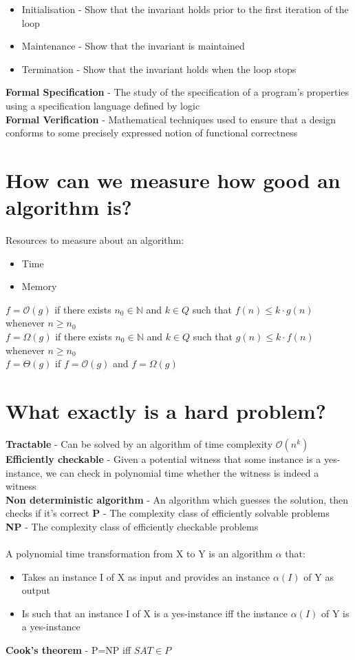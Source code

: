 \documentclass{article}[18pt]
\begin{document}
\begin{itemize}
	\item Initialisation - Show that the invariant holds prior to the first iteration of the loop
	\item Maintenance - Show that the invariant is maintained
	\item Termination - Show that the invariant holds when the loop stops
\end{itemize}
\textbf{Formal Specification} - The study of the specification of a program's properties using a specification language defined by logic\\
\textbf{Formal Verification} - Mathematical techniques used to ensure that a design conforms to some precisely expressed notion of functional correctness
\section{How can we measure how good an algorithm is?}
Resources to measure about an algorithm:
\begin{itemize}
	\item Time
	\item Memory
\end{itemize}
$f=\mathcal{O}(g)$ if there exists $n_0\in \mathbb{N}$ and $k\in Q$ such that $f(n)\leqslant k\cdot g(n)$ whenever $n\geqslant n_0$\\
$f=\Omega(g)$ if there exists $n_0\in \mathbb{N}$ and $k\in Q$ such that $g(n)\leqslant k\cdot f(n)$ whenever $n\geqslant n_0$\\
$f=\Theta(g)$ if $f=\mathcal{O}(g)$ and $f=\Omega(g)$
\section{What exactly is a hard problem?}
\textbf{Tractable} - Can be solved by an algorithm of time complexity $\mathcal{O}(n^k)$\\
\textbf{Efficiently checkable} - Given a potential witness that some instance is a yes-instance, we can check in polynomial time whether the witness is indeed a witness\\
\textbf{Non deterministic algorithm} - An algorithm which guesses the solution, then checks if it's correct
\textbf{P} - The complexity class of efficiently solvable problems\\
\textbf{NP} - The complexity class of efficiently checkable problems\\
\\
A polynomial time transformation from X to Y is an algorithm $\alpha$ that:
\begin{itemize}
	\item Takes an instance I of X as input and provides an instance $\alpha(I)$ of Y as output
	\item Is such that an instance I of X is a yes-instance iff the instance $\alpha(I)$ of Y is a yes-instance
\end{itemize}
\textbf{Cook's theorem} - P=NP iff $SAT\in P$
\end{document}
